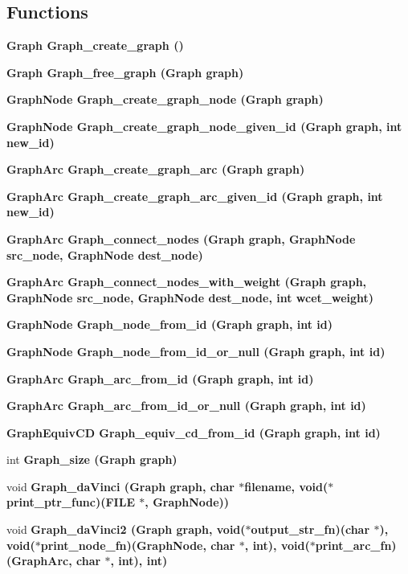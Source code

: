 \subsection*{Functions}
\begin{CompactItemize}
\item 
\bf{Graph} \bf{Graph\_\-create\_\-graph} ()
\item 
\bf{Graph} \bf{Graph\_\-free\_\-graph} (\bf{Graph} \bf{graph})
\item 
\bf{Graph\-Node} \bf{Graph\_\-create\_\-graph\_\-node} (\bf{Graph} \bf{graph})
\item 
\bf{Graph\-Node} \bf{Graph\_\-create\_\-graph\_\-node\_\-given\_\-id} (\bf{Graph} \bf{graph}, int new\_\-id)
\item 
\bf{Graph\-Arc} \bf{Graph\_\-create\_\-graph\_\-arc} (\bf{Graph} \bf{graph})
\item 
\bf{Graph\-Arc} \bf{Graph\_\-create\_\-graph\_\-arc\_\-given\_\-id} (\bf{Graph} \bf{graph}, int new\_\-id)
\item 
\bf{Graph\-Arc} \bf{Graph\_\-connect\_\-nodes} (\bf{Graph} \bf{graph}, \bf{Graph\-Node} src\_\-node, \bf{Graph\-Node} dest\_\-node)
\item 
\bf{Graph\-Arc} \bf{Graph\_\-connect\_\-nodes\_\-with\_\-weight} (\bf{Graph} \bf{graph}, \bf{Graph\-Node} src\_\-node, \bf{Graph\-Node} dest\_\-node, int wcet\_\-weight)
\item 
\bf{Graph\-Node} \bf{Graph\_\-node\_\-from\_\-id} (\bf{Graph} \bf{graph}, int id)
\item 
\bf{Graph\-Node} \bf{Graph\_\-node\_\-from\_\-id\_\-or\_\-null} (\bf{Graph} \bf{graph}, int id)
\item 
\bf{Graph\-Arc} \bf{Graph\_\-arc\_\-from\_\-id} (\bf{Graph} \bf{graph}, int id)
\item 
\bf{Graph\-Arc} \bf{Graph\_\-arc\_\-from\_\-id\_\-or\_\-null} (\bf{Graph} \bf{graph}, int id)
\item 
\bf{Graph\-Equiv\-CD} \bf{Graph\_\-equiv\_\-cd\_\-from\_\-id} (\bf{Graph} \bf{graph}, int id)
\item 
int \bf{Graph\_\-size} (\bf{Graph} \bf{graph})
\item 
void \bf{Graph\_\-da\-Vinci} (\bf{Graph} \bf{graph}, char $\ast$filename, void($\ast$print\_\-ptr\_\-func)(FILE $\ast$, \bf{Graph\-Node}))
\item 
void \bf{Graph\_\-da\-Vinci2} (\bf{Graph} \bf{graph}, void($\ast$output\_\-str\_\-fn)(char $\ast$), void($\ast$print\_\-node\_\-fn)(\bf{Graph\-Node}, char $\ast$, int), void($\ast$print\_\-arc\_\-fn)(\bf{Graph\-Arc}, char $\ast$, int), int)

\end{CompactItemize}
